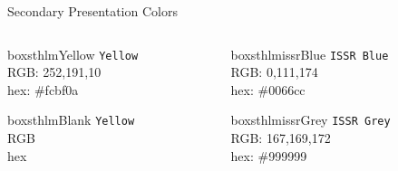 \documentclass[newPxFont]{beamer}
\begin{document}
\begin{frame}[c]{Secondary Presentation Colors}
\begin{columns}[c]
\begin{column}{0.23\textwidth}

\begin{beamercolorbox}[wd=\linewidth,ht=10ex,dp=3ex]{boxsthlmYellow}
\centering
	\texttt{Yellow}\\
	\vspace{1em}
	\tiny{RGB:  252,191,10} \\
	\tiny{hex: \#fcbf0a}
\end{beamercolorbox}

\vspace{3em}

\begin{beamercolorbox}[wd=\linewidth,ht=10ex,dp=3ex]{boxsthlmBlank}
\centering
	\texttt{Yellow}\\
	\vspace{1em}
	\tiny{RGB} \\
	\tiny{hex}
\end{beamercolorbox}
\end{column}


\begin{column}{0.23\textwidth}
\begin{beamercolorbox}[wd=\linewidth,ht=10ex,dp=3ex]{boxsthlmissrBlue}
\centering
	\texttt{ISSR Blue}\\
	\vspace{1em}
	\tiny{RGB:  0,111,174} \\
	\tiny{hex: \#0066cc}
\end{beamercolorbox}

\vspace{3em}

\begin{beamercolorbox}[wd=\linewidth,ht=10ex,dp=3ex]{boxsthlmissrGrey}
\centering
	\texttt{ISSR Grey}\\
	\vspace{1em}
	\tiny{RGB:  167,169,172} \\
	\tiny{hex: \#999999}
\end{beamercolorbox}
\end{column}
\end{columns}

\end{frame}
\end{document}
